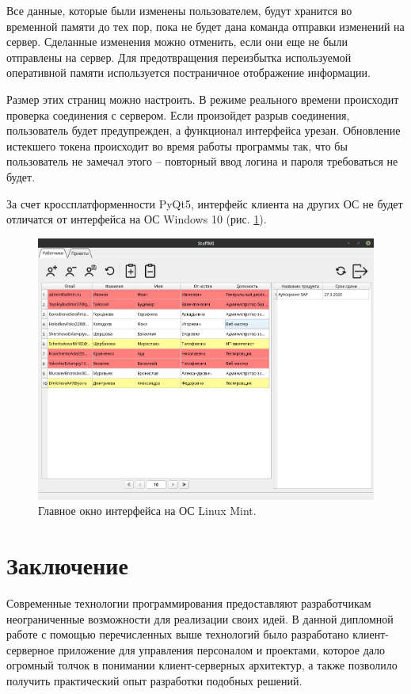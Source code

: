 \documentclass[14pt, a4paper]{extarticle}
\begin{document}
    Все данные, которые были изменены пользователем, будут хранится во временной памяти до тех пор, пока не будет дана команда отправки изменений на сервер. Сделанные изменения можно отменить, если они еще не были отправлены на сервер. Для предотвращения переизбытка используемой оперативной памяти используется постраничное отображение информации.

    Размер этих страниц можно настроить. В режиме реального времени происходит проверка соединения с сервером. Если произойдет разрыв соединения, пользователь будет предупрежден, а функционал интерфейса урезан. Обновление истекшего токена происходит во время работы программы так, что бы пользователь не замечал этого – повторный ввод логина и пароля требоваться не будет.

    За счет кроссплатформенности PyQt5, интерфейс клиента на других ОС не будет отличатся от интерфейса на ОС Windows 10 (рис. \ref{fig:main_window_linux}).
    
    \begin{figure}[h]
        \centering
        \includegraphics[width=1\linewidth]{img/main_window_linux.png}
        \caption{Главное окно интерфейса на ОС Linux Mint.}
        \label{fig:main_window_linux}
    \end{figure}


    \clearpage
    \section{Заключение}
    Современные технологии программирования предоставляют разработчикам неограниченные возможности для реализации своих идей. В данной дипломной работе с помощью перечисленных выше технологий было разработано клиент-серверное приложение для управления персоналом и проектами, которое дало огромный толчок в понимании клиент-серверных архитектур, а также позволило получить практический опыт разработки подобных решений.
\end{document}
